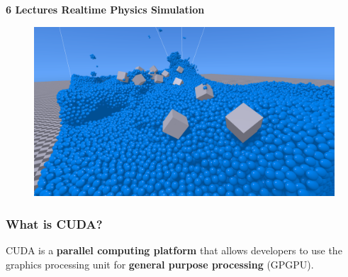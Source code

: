 \documentclass[aspectratio=169]{beamer}
\begin{document}
\begin{frame}[fragile]
\begin{minipage}{0.48\linewidth}
\end{minipage}
\begin{minipage}{0.48\linewidth}
\centering
\textbf{   6 Lectures Realtime Physics Simulation}
   	\begin{figure}
   \includegraphics[height=.35\textheight]{agphys}
   	\end{figure}
\end{minipage}
\end{frame}


\frame
{
	\frametitle{What is CUDA?}
	\begin{mdframed}
		CUDA is a \textbf{parallel computing platform} that allows developers to use the graphics processing unit for \textbf{general purpose processing} (GPGPU).
	\end{mdframed}
}
\end{document}

